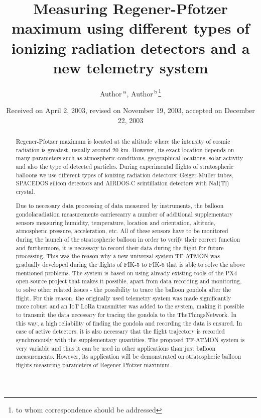 \documentclass{Rpd}
\begin{document}
\def\Sectitle{Section Title}%

\def\copyrightyear{2004}%

\title[short Title]{Measuring Regener-Pfotzer maximum using different types of ionizing radiation detectors and a new telemetry system}
\author[Sample \textit{et~al}]{Author\,$^{\rm a}$, Author\,$^{\rm b}$\footnote{to whom correspondence should be addressed}}
\address{$^{\rm a}$Address followed, $^{\rm b}$Address followed}

\date{Received on April 2, 2003, revised on November 19, 2003,
  accepted on December 22, 2003}

\begin{abstract}
Regener-Pfotzer maximum is located at the altitude where the intensity of cosmic radiation is greatest, usually around 20 km. However, its exact location depends on many parameters such as atmospheric conditions, geographical locations, solar activity and also the type of detected particles. During experimental flights of stratospheric balloons we use different types of ionizing radiation detectors: Geiger-Muller tubes, SPACEDOS silicon detectors and AIRDOS-C scintillation detectors with NaI(Tl) crystal.

Due to necessary data processing of data measured by instruments, the balloon gondolaradiation measurements carriescarry a number of additional supplementary sensors measuring humidity, temperature, location and orientation, altitude, atmospheric pressure, acceleration, etc. All of these sensors have to be monitored during the launch of the stratospheric balloon in order to verify their correct function and furthermore, it is necessary to record their data during the flight for future processing. This was the reason why a new universal system TF-ATMON was gradually developed during the flights of FIK-5 to FIK-6 that is able to solve the above mentioned problems. The system is based on using already existing tools of the PX4 open-source project that makes it possible, apart from data recording and monitoring, to solve other related issues - the possibility to trace the balloon gondola after the flight. For this reason, the originally used telemetry system was made significantly more robust and an IoT LoRa transmitter was added to the system, making it possible to transmit the data necessary for tracing the gondola to the TheThingsNetwork. In this way, a high reliability of finding the gondola and recording the data is ensured. In case of active detectors, it is also necessary that the flight trajectory is recorded synchronously with the supplementary quantities.
The proposed TF-ATMON system is very variable and thus it can be used in other applications than just balloon measurements. However, its application will be demonstrated on stratospheric balloon flights measuring parameters of Regener-Pfotzer maximum.

\end{abstract}
\end{document}
